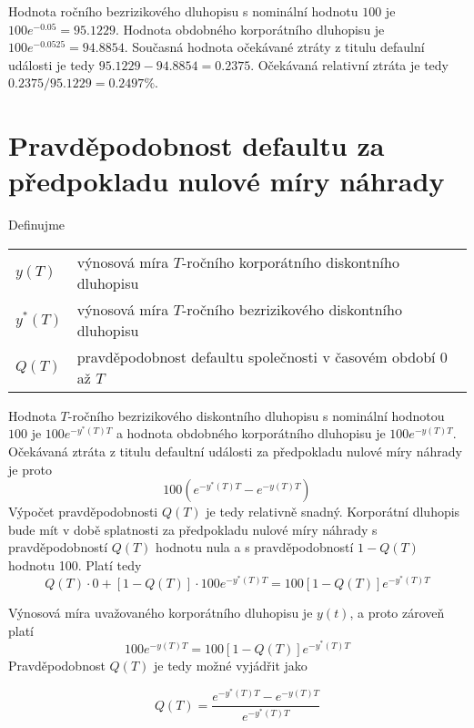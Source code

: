 \documentclass[a4paper]{book}
\begin{document}
Hodnota ročního bezrizikového dluhopisu s nominální hodnotu $100$ je $100e^{-0.05} = 95.1229$. Hodnota obdobného korporátního dluhopisu je $100e^{-0.0525}=94.8854$. Současná hodnota očekávané ztráty z titulu defaulní události je tedy $95.1229 - 94.8854 = 0.2375$. Očekávaná relativní ztráta je tedy $0.2375/95.1229 = 0.2497\%$.\\

\section{Pravděpodobnost defaultu za předpokladu nulové míry náhrady}

Definujme
\begin{center}
\begin{tabular}{l l}
$y(T)$   & výnosová míra $T$-ročního korporátního diskontního dluhopisu\\
$y^*(T)$  & výnosová míra $T$-ročního bezrizikového diskontního dluhopisu\\
$Q(T)$    & pravděpodobnost defaultu společnosti v časovém období 0 až $T$\\
\end{tabular}
\end{center}

Hodnota $T$-ročního bezrizikového diskontního dluhopisu s nominální hodnotou $100$ je $100e^{-y^*(T)T}$ a hodnota obdobného korporátního dluhopisu je $100e^{-y(T)T}$. Očekávaná ztráta z titulu defaultní události za předpokladu nulové míry náhrady je proto
\begin{equation*}
100(e^{-y^*(T)T}-e^{-y(T)T})
\end{equation*}
Výpočet pravděpodobnosti $Q(T)$ je tedy relativně snadný. Korporátní dluhopis bude mít v době splatnosti za předpokladu nulové míry náhrady s pravděpodobností $Q(T)$ hodnotu nula a s pravděpodobností $1-Q(T)$ hodnotu 100. Platí tedy
\begin{equation*}
{Q(T) \cdot 0 + [1-Q(T)] \cdot 100}e^{-y^*(T)T} = 100[1-Q(T)]e^{-y^*(T)T}
\end{equation*}

Výnosová míra uvažovaného korporátního dluhopisu je $y(t)$, a proto zároveň platí
\begin{equation*}
100e^{-y(T)T}=100[1-Q(T)]e^{-y^*(T)T}
\end{equation*}
Pravděpodobnost $Q(T)$ je tedy možné vyjádřit jako

\begin{equation*}
Q(T) = \frac{e^{-y^*(T)T}-e^{-y(T)T}}{e^{-y^*(T)T}}
\end{equation*}
\end{document}
